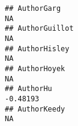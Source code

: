 \documentclass[]{article}
\begin{document}
\begin{verbatim}
## AuthorGarg                                                                                                                                                                                                                                                                                                                                                                                                                                                                            NA
## AuthorGuillot                                                                                                                                                                                                                                                                                                                                                                                                                                                                         NA
## AuthorHisley                                                                                                                                                                                                                                                                                                                                                                                                                                                                          NA
## AuthorHoyek                                                                                                                                                                                                                                                                                                                                                                                                                                                                           NA
## AuthorHu                                                                                                                                                                                                                                                                                                                                                                                                                                                                        -0.48193
## AuthorKeedy                                                                                                                                                                                                                                                                                                                                                                                                                                                                           NA

\end{verbatim}
\end{document}
